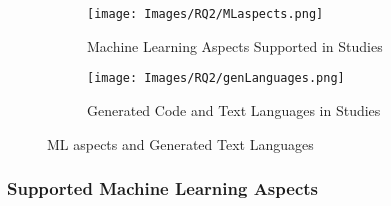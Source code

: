 \begin{figure}[htbp]
\centering
    \begin{subfigure}{0.49\textwidth}
    \texttt{[image: Images/RQ2/MLaspects.png]}
    \caption{Machine Learning Aspects Supported in Studies}
    \label{fig:MLaspects}
    \end{subfigure}
\hfill
    \begin{subfigure}{0.49\textwidth}
    \centering
    \texttt{[image: Images/RQ2/genLanguages.png]}
    \caption{Generated Code and Text Languages in Studies}    
    \label{fig:generatedlanguages}
\end{subfigure}
\caption{ML aspects and Generated Text Languages}
\end{figure}

\subsubsection{Supported Machine Learning Aspects}

